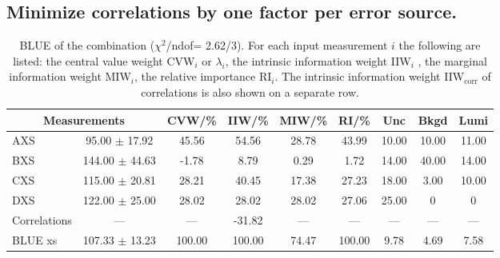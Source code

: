 \subsection{Minimize correlations by one factor per error source.}
\begin{table}[H]
\scriptsize
\begin{center}
\renewcommand{\arraystretch}{1.1}
\begin{tabular}{|lc|c|c|c|c|ccc|}
\hline
\multicolumn{2}{|c|}{Measurements} & CVW/\%  & IIW/\%  & MIW/\%  & RI/\%  & {\tiny Unc} & {\tiny Bkgd} & {\tiny Lumi}\\
\hline
AXS &      95.00 $\pm$      17.92 &      45.56 &      54.56 &      28.78 &      43.99 &      10.00 &      10.00 &      11.00\\
BXS &     144.00 $\pm$      44.63 &      -1.78 &       8.79 &       0.29 &       1.72 &      14.00 &      40.00 &      14.00\\
CXS &     115.00 $\pm$      20.81 &      28.21 &      40.45 &      17.38 &      27.23 &      18.00 &       3.00 &      10.00\\
DXS &     122.00 $\pm$      25.00 &      28.02 &      28.02 &      28.02 &      27.06 &      25.00 &  0 &  0\\
Correlations & --- & --- &     -31.82 & --- & --- & --- & --- & ---\\
\hline
BLUE {\tiny xs} &     107.33 $\pm$      13.23 &     100.00 &     100.00 &      74.47 &     100.00 &       9.78 &       4.69 &       7.58\\
\hline
\end{tabular}
\caption{BLUE of the combination ($\chi^2$/ndof=      2.62/3).
 For each input measurement $i$ the following are listed: the central value weight CVW$_i$ or $\lambda_i$, the intrinsic information weight IIW$_i$ , the marginal information weight MIW$_i$, the relative importance RI$_i$. The intrinsic information weight IIW$_{\mathrm{corr}}$ of correlations is also shown on a separate row.}
\renewcommand{\arraystretch}{1}
\end{center}
\end{table}
